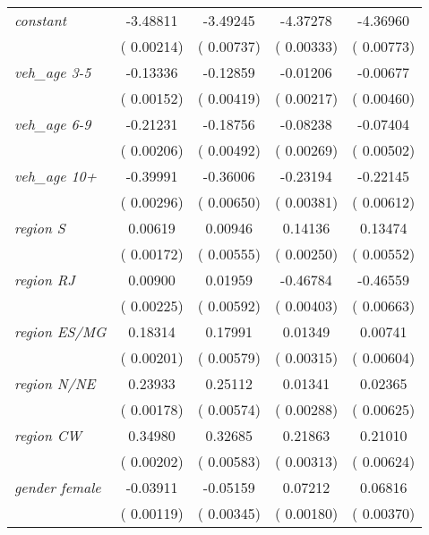 {\begin{ThreePartTable}
\begin{longtable}{lcccc}
    \textit{constant} & -3.48811 & -3.49245 & -4.37278 & -4.36960 \\
    & \scriptsize{( 0.00214)} & \scriptsize{( 0.00737)} & \scriptsize{( 0.00333)} & \scriptsize{( 0.00773)} \\
    \textit{veh\_age 3-5} & -0.13336 & -0.12859 & -0.01206 & -0.00677 \\
    & \scriptsize{( 0.00152)} & \scriptsize{( 0.00419)} & \scriptsize{( 0.00217)} & \scriptsize{( 0.00460)} \\
    \textit{veh\_age 6-9} & -0.21231 & -0.18756 & -0.08238 & -0.07404 \\
    & \scriptsize{( 0.00206)} & \scriptsize{( 0.00492)} & \scriptsize{( 0.00269)} & \scriptsize{( 0.00502)} \\
    \textit{veh\_age 10+} & -0.39991 & -0.36006 & -0.23194 & -0.22145 \\
    & \scriptsize{( 0.00296)} & \scriptsize{( 0.00650)} & \scriptsize{( 0.00381)} & \scriptsize{( 0.00612)} \\
    \textit{region S} &  0.00619 &  0.00946 \tnote{\dag} &  0.14136 &  0.13474 \\
    & \scriptsize{( 0.00172)} & \scriptsize{( 0.00555)} & \scriptsize{( 0.00250)} & \scriptsize{( 0.00552)} \\
    \textit{region RJ} &  0.00900 &  0.01959 & -0.46784 & -0.46559 \\
    & \scriptsize{( 0.00225)} & \scriptsize{( 0.00592)} & \scriptsize{( 0.00403)} & \scriptsize{( 0.00663)} \\
    \textit{region ES/MG} &  0.18314 &  0.17991 &  0.01349 &  0.00741 \tnote{\dag\dag} \\
    & \scriptsize{( 0.00201)} & \scriptsize{( 0.00579)} & \scriptsize{( 0.00315)} & \scriptsize{( 0.00604)} \\
    \textit{region N/NE} &  0.23933 &  0.25112 &  0.01341 &  0.02365 \\
    & \scriptsize{( 0.00178)} & \scriptsize{( 0.00574)} & \scriptsize{( 0.00288)} & \scriptsize{( 0.00625)} \\
    \textit{region CW} &  0.34980 &  0.32685 &  0.21863 &  0.21010 \\
    & \scriptsize{( 0.00202)} & \scriptsize{( 0.00583)} & \scriptsize{( 0.00313)} & \scriptsize{( 0.00624)} \\
    \textit{gender female} & -0.03911 & -0.05159 &  0.07212 &  0.06816 \\
    & \scriptsize{( 0.00119)} & \scriptsize{( 0.00345)} & \scriptsize{( 0.00180)} & \scriptsize{( 0.00370)} \\

\end{longtable}
\end{ThreePartTable}}
